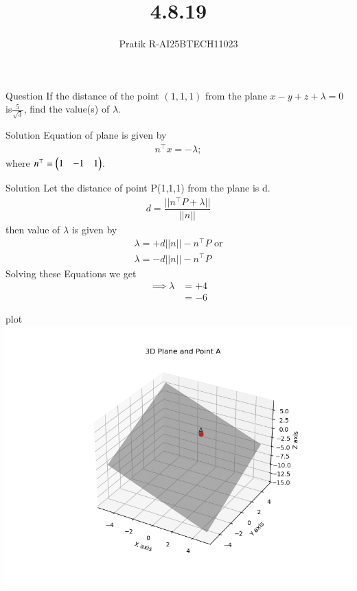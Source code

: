 \documentclass{beamer}
\title 
{4.8.19}
\author 
{Pratik R-AI25BTECH11023}
\begin{document}
\frame{\titlepage}
\begin{frame}{Question}
If the distance of the point $(1,1,1)$ from the plane $x-y+z+ \lambda = 0$ is$\frac{5}{\sqrt{3}}$, find the value(s) of $\lambda$.
\end{frame}
\begin{frame}{Solution} 
Equation of plane is given by
\begin{align}
    n^\top x = -\lambda;
\end{align}
where $n^\top = \begin{pmatrix}1&-1&1\end{pmatrix}$. 
\end{frame}
\begin{frame}{Solution}
Let the distance of point P(1,1,1) from the plane is d.
\begin{align}
d = \dfrac{||n^\top P + \lambda||}{||n||}
\end{align}
then value of $\lambda $ is given by
\begin{align}
    \lambda = + d||n||-n^\top P \text{ or} \\
    \lambda = - d||n||-n^\top P
\end{align}
Solving these Equations we get
\begin{align}
   \implies \lambda &= +4 \\
    &=-6
\end{align}
\end{frame}
\begin{frame}{plot}
\centering
    \includegraphics[width=\columnwidth, height=0.8\textheight, keepaspectratio]{../figs/fig1.png}     
\end{frame}
\end{document}

